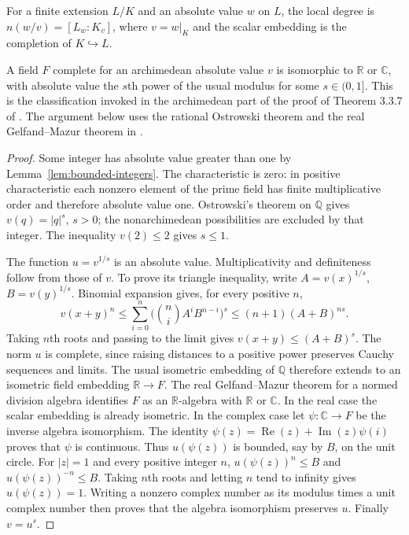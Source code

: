 \begin{definition}\label{def:local-degree}
\leanok
{}
For a finite extension $L/K$ and an absolute value $w$ on $L$, the local
degree is $n(w/v)=[L_w:K_v]$, where $v=w|_K$ and the scalar embedding is
the completion of $K\hookrightarrow L$.
\end{definition}

\begin{theorem}
\label{thm:complete-archimedean}
\leanok
{}
A field $F$ complete for an archimedean absolute value $v$ is isomorphic to
$\mathbb R$ or $\mathbb C$, with absolute value the $s$th power of the
usual modulus for some $s\in(0,1]$.
This is the classification invoked in the archimedean part of the proof
of Theorem 3.3.7 of \cite{chen-moriwaki}. The argument below uses the
rational Ostrowski theorem and the real Gelfand--Mazur theorem in
\cite{mathlib-archimedean-classification}.
\end{theorem}
\begin{proof}
Some integer has absolute value greater than one by
Lemma~\ref{lem:bounded-integers}. The characteristic is zero: in positive
characteristic each nonzero element of the prime field has finite
multiplicative order and therefore absolute value one. Ostrowski's theorem
on $\mathbb Q$ gives $v(q)=|q|^s$, $s>0$; the nonarchimedean possibilities
are excluded by that integer. The inequality $v(2)\leq2$ gives $s\leq1$.

The function $u=v^{1/s}$ is an absolute value. Multiplicativity and
definiteness follow from those of $v$. To prove its triangle inequality,
write $A=v(x)^{1/s}$, $B=v(y)^{1/s}$. Binomial expansion gives, for every
positive $n$,
\[
 v(x+y)^n\leq\sum_{i=0}^n
  \bigl(\binom{n}{i}A^iB^{n-i}\bigr)^s
 \leq(n+1)(A+B)^{ns}.
\]
Taking $n$th roots and passing to the limit gives $v(x+y)\leq(A+B)^s$.
The norm $u$ is complete, since raising distances to a positive power
preserves Cauchy sequences and limits. The usual isometric embedding of
$\mathbb Q$ therefore extends to an isometric field embedding
$\mathbb R\to F$. The real Gelfand--Mazur theorem for a normed division
algebra identifies $F$ as an $\mathbb R$-algebra with $\mathbb R$ or
$\mathbb C$. In the real case the scalar embedding is already isometric.
In the complex case let $\psi:\mathbb C\to F$ be the inverse algebra
isomorphism. The identity
$\psi(z)=\operatorname{Re}(z)+\operatorname{Im}(z)\psi(i)$ proves that
$\psi$ is continuous. Thus $u(\psi(z))$ is bounded, say by $B$, on the
unit circle. For $|z|=1$ and every positive integer $n$,
$u(\psi(z))^n\leq B$ and $u(\psi(z))^{-n}\leq B$. Taking $n$th roots
and letting $n$ tend to infinity gives $u(\psi(z))=1$.
Writing a nonzero complex number as its modulus times a unit complex number
then proves that the algebra isomorphism preserves $u$. Finally $v=u^s$.
\end{proof}

